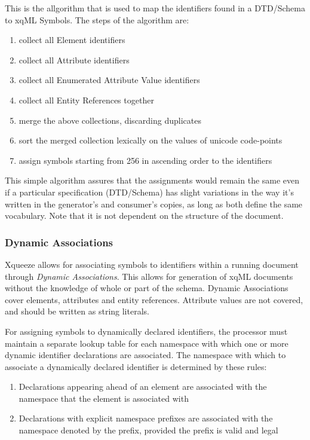 
This is the allgorithm that is used to map the identifiers found in a
DTD/Schema to xqML Symbols. The steps of the algorithm are:
\begin{enumerate}
\item collect all Element identifiers
\item collect all Attribute identifiers
\item collect all Enumerated Attribute Value identifiers
\item collect all Entity References together
\item merge the above collections, discarding duplicates
\item sort the merged collection lexically on the values of unicode
  code-points
\item assign symbols starting from 256 in ascending order to the
  identifiers
\end{enumerate}

This simple algorithm assures that the assignments would remain the
same even if a particular specification (DTD/Schema) has slight
variations in the way it's written in the generator's and consumer's
copies, as long as both define the same vocabulary. Note that it is
not dependent on the structure of the document.

\subsubsection{Dynamic Associations} \label{section:DynamicAssoc}

Xqueeze allows for associating symbols to identifiers within a running
document through {\it Dynamic Associations}. This allows for
generation of xqML documents without the knowledge of whole or part of
the schema. Dynamic Associations cover elements, attributes and entity
references. Attribute values are not covered, and should be written as
string literals.

For assigning symbols to dynamically declared identifiers, the
processor must maintain a separate lookup table for each namespace
with which one or more dynamic identifier declarations are
associated. The namespace with which to associate a dynamically
declared identifier is determined by these rules:
\begin{enumerate}
\item Declarations appearing ahead of an element are associated with
  the namespace that the element is associated with
\item Declarations with explicit namespace prefixes are associated
  with the namespace denoted by the prefix, provided the prefix is
  valid and legal
\end{enumerate}


